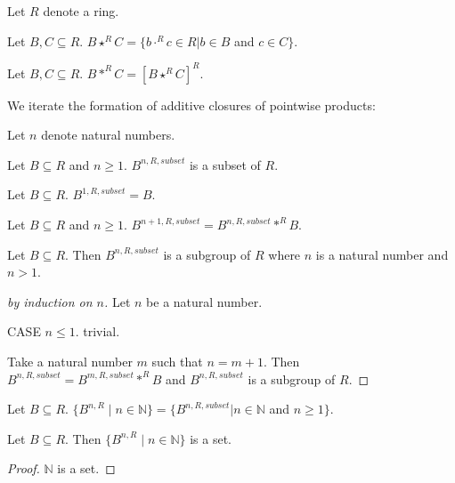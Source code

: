 \documentclass[11pt]{article}
\newcommand{\Powers}[2]{\{{#1}^{n,#2} \mid n \in \mathbb{N}\}}
\begin{document}
\begin{forthel}

Let $R$ denote a ring.

\begin{definition}
Let $B,C \subseteq R$.
$B \star^{R} C = \{b \cdot^{R} c \in R | b \in B$ and $c \in C\}$.
\end{definition} 

\begin{definition}
Let $B,C \subseteq R$. 
$B \ast^{R} C = [B \star^{R} C]^{R}$.
\end{definition}

\end{forthel}
We iterate the formation of additive closures of pointwise products:
\begin{forthel}

Let $n$ denote natural numbers.

\begin{signature}
Let $B \subseteq R$ and $n \geq 1$.
$B^{n,R,subset}$ is a subset of $R$.
\end{signature}

\begin{axiom}
Let $B \subseteq R$. $B^{1,R,subset} = B$.
\end{axiom}

\begin{axiom}
Let $B \subseteq R$ and $n \geq 1$.
$B^{n+1,R,subset} = B^{n,R,subset} \ast^{R} B$. 
\end{axiom}

\begin{lemma}
Let $B \subseteq R$. Then
$B^{n,R,subset}$ is a subgroup of $R$ 
where $n$ is a natural number and $n > 1$.
\end{lemma}
\begin{proof}[by induction on $n$]

Let $n$ be a natural number.

CASE $n \leq 1$. trivial.

Take a natural number $m$ such that $n = m + 1$.
Then $B^{n,R,subset} = B^{m,R,subset} \ast^{R} B$ and
$B^{n,R,subset}$ is a subgroup of $R$.
\end{proof}


\begin{definition} Let $B \subseteq R$.
$\Powers{B}{R} = \{B^{n,R,subset} | n \in \mathbb{N}$ and $n \geq 1\} $.
\end{definition}

\begin{lemma}
Let $B \subseteq R$. Then $\Powers{B}{R}$ is a set.
\end{lemma}
\begin{proof} $\mathbb{N}$ is a set.
\end{proof}

\end{forthel}
\end{document}
